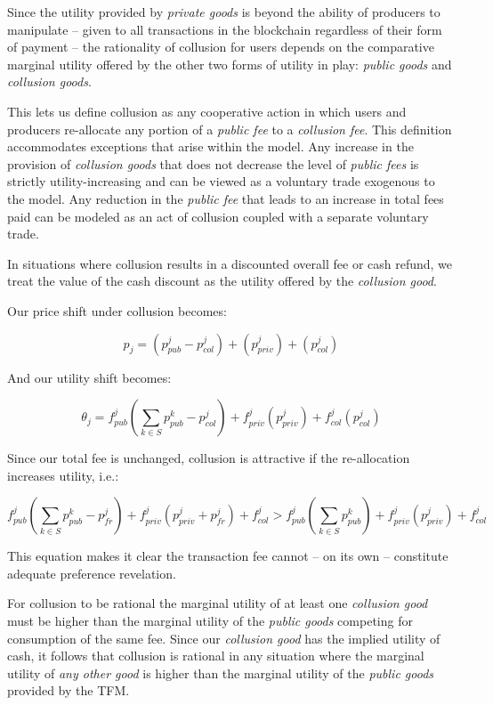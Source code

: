 \documentclass[oneside]{article}   	%
\begin{document}
Since the utility provided by \textit{private goods} is beyond the ability of producers to manipulate -- given to all transactions in the blockchain regardless of their form of payment -- the rationality of collusion for users depends on the comparative marginal utility offered by the other two forms of utility in play: \textit{public goods} and \textit{collusion goods}.

This lets us define collusion as any cooperative action in which users and producers re-allocate any portion of a \textit{public fee} to a \textit{collusion fee}. This definition accommodates exceptions that arise within the model. Any increase in the provision of \textit{collusion goods} that does not decrease the level of \textit{public fees} is strictly utility-increasing and can be viewed as a voluntary trade exogenous to the model. Any reduction in the \textit{public fee} that leads to an increase in total fees paid can be modeled as an act of collusion coupled with a separate voluntary trade.

In situations where collusion results in a discounted overall fee or cash refund, we treat the value of the cash discount as the utility offered by the \textit{collusion good}.

Our price shift under collusion becomes:

$$
p_j = \left( p_{pub}^j - p_{col}^j \right) + \left( p_{priv}^j \right) + \left( p_{col}^j \right)
$$

And our utility shift becomes:

$$
\theta_j = f_{pub}^j\left(\sum_{k \in S} p_{pub}^{k} - p_{col}^j \right) + f_{priv}^j\left( p_{priv}^j \right) + f_{col}^j\left(p_{col}^j \right)
$$

Since our total fee is unchanged, collusion is attractive if the re-allocation increases utility, i.e.:

\[
f_{pub}^j\left(\sum_{k \in S} p_{pub}^{k} - p_{fr}^j \right) + f_{priv}^j( p_{priv}^j + p_{fr}^j ) + f_{col}^j
>
f_{pub}^j\left(\sum_{k \in S} p_{pub}^{k}\right) + f_{priv}^j(p_{priv}^j) + f_{col}^j
\]

This equation makes it clear the transaction fee cannot -- on its own -- constitute adequate preference revelation.

For collusion to be rational the marginal utility of at least one \textit{collusion good} must be higher than the marginal utility of the \textit{public goods} competing for consumption of the same fee. Since our \textit{collusion good} has the implied utility of cash, it follows that collusion is rational in any situation where the marginal utility of \textit{any other good} is higher than the marginal utility of the \textit{public goods} provided by the TFM.
\end{document}

